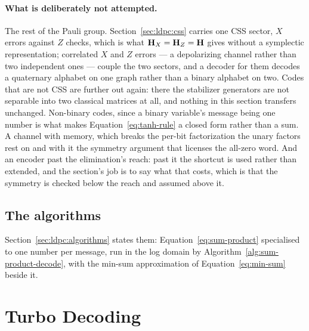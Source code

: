 \documentclass[11pt,a4paper]{article}
\begin{document}
\paragraph{What is deliberately not attempted.}
The rest of the Pauli group. Section~\ref{sec:ldpc:css} carries one CSS
sector, $X$ errors against $Z$ checks, which is what
$\mathbf{H}_X = \mathbf{H}_Z = \mathbf{H}$ gives without a symplectic representation;
correlated $X$ and $Z$ errors --- a depolarizing channel rather than two
independent ones --- couple the two sectors, and a decoder for them decodes a
quaternary alphabet on one graph rather than a binary alphabet on two. Codes
that are not CSS are further out again: there the stabilizer generators are
not separable into two classical matrices at all, and nothing in this section
transfers unchanged. Non-binary codes, since a
binary variable's message being one number is what makes
Equation~\ref{eq:tanh-rule} a closed form rather than a sum. A channel
with memory, which breaks the per-bit factorization the unary factors rest on
and with it the symmetry argument that licenses the all-zero word. And an
encoder past the elimination's reach: past it the shortcut is used rather than
extended, and the section's job is to say what that costs, which is that the
symmetry is checked below the reach and assumed above it.

\subsection{The algorithms}
Section~\ref{sec:ldpc:algorithms} states them:
Equation~\ref{eq:sum-product} specialised to one number per message, run in the
log domain by Algorithm~\ref{alg:sum-product-decode}, with the min-sum
approximation of Equation~\ref{eq:min-sum} beside it.

\section{Turbo Decoding}
\label{sec:turbo}
\end{document}
